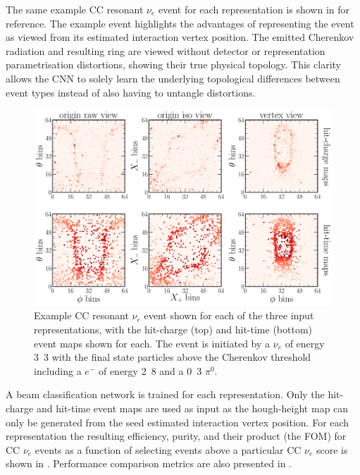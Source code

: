 The same example CC resonant $\nu_{e}$ event for each representation is shown in
 for reference. The example event highlights the
advantages of representing the event as viewed from its estimated interaction vertex position. The
emitted Cherenkov radiation and resulting ring are viewed without detector or representation
parametrisation distortions, showing their true physical topology. This clarity allows the CNN to
solely learn the underlying topological differences between event types instead of also having to
untangle distortions.

\begin{figure} %
    \includegraphics[width=\textwidth]{diagrams/7-results/explore_repr_nuel_ccres_event.pdf}
    \caption[Example CC resonant $\nu_{e}$ event shown for different input representations]
    {Example CC resonant $\nu_{e}$ event shown for each of the three input representations, with
        the hit-charge (top) and hit-time (bottom) event maps shown for each. The event is
        initiated by a $\nu_{e}$ of energy \unit{3.3}{\GeV} with the final state particles above
        the Cherenkov threshold including a $e^{-}$ of energy \unit{2.8}{\GeV} and a
        \unit{0.3}{\GeV} $\pi^{0}$.}
    \label{fig:explore_repr_nuel_ccres_event}
\end{figure}


A beam classification network is trained for each representation. Only the hit-charge and hit-time
event maps are used as input as the hough-height map can only be generated from the seed estimated
interaction vertex position. For each representation the resulting efficiency, purity, and their
product (the FOM) for CC $\nu_{e}$ events as a function of selecting events above a particular CC
$\nu_{e}$ score is shown in . Performance comparison metrics
are also presented in .

